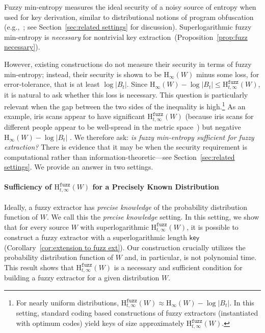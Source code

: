 \documentclass[11pt]{article}
\newcommand{\secref}[1]{\mbox{Section~\ref{#1}}}
\newcommand{\corref}[1]{\mbox{Corollary~\ref{#1}}}
\newcommand{\propref}[1]{\mbox{Proposition~\ref{#1}}}
\newcommand{\class}[1]{{\ensuremath{\mathsf{#1}}}}
\newcommand{\key}{\ensuremath{\class{key}}\xspace}
\newcommand{\Hoo}{\mathrm{H}_\infty}
\newcommand{\Hfuzz}{\mathrm{H}^{\mathtt{fuzz}}_{t,\infty}}
\begin{document}
Fuzzy min-entropy measures the ideal security of a noisy source of
entropy when used for key derivation, similar to distributional
notions of program obfuscation
(e.g.,~\cite{barak2001possibility,DBLP:conf/stoc/DodisS05,DBLP:conf/tcc/DodisS05};
see \secref{sec:related settings} for discussion).  Superlogarithmic fuzzy min-entropy is \emph{necessary} for nontrivial key extraction~(\propref{prop:fuzz necessary}).  

However, existing constructions do not measure their security in terms
of fuzzy min-entropy; instead, their security is shown to be
$\Hoo(W)$ minus some loss, for error-tolerance, that is at least $\log |B_t|$. Since $\Hoo(W)-\log |B_t| \le \Hfuzz(W)$, it is natural to ask whether this loss is necessary. This question is particularly relevant when the gap between the two sides of the inequality is high.\footnote{For nearly uniform distributions, $\Hfuzz(W) \approx \Hoo(W)- \log |B_t|$.  In this setting, standard coding based constructions of fuzzy extractors (instantiated with optimum codes) yield keys of size approximately $\Hfuzz(W)$.}  As an example, iris scans appear to have significant $\Hfuzz(W)$ (because iris scans for different people appear to be well-spread in the metric space~\cite{daugman2006probing}) but negative $\Hoo(W) -\log |B_t|$ \cite[Section 5]{blanton2009biometric}. We therefore ask: \emph{is fuzzy min-entropy sufficient for fuzzy extraction?} There is evidence that it may be when the security requirement is computational rather than information-theoretic---see \secref{sec:related settings}. We provide an answer in two settings.

\paragraph{Sufficiency of $\Hfuzz(W)$ for a Precisely Known Distribution}
Ideally, a fuzzy extractor has \emph{precise knowledge} of the
probability distribution function of $W$.  We call this  the
\emph{precise knowledge} setting.  In this setting, we show that for
every source $W$ with superlogarithmic $\Hfuzz(W)$, it is possible to
construct a fuzzy extractor with a superlogarithmic length $\key$
(\corref{cor:extension to fuzz ext}). Our construction crucially
utilizes the probability distribution function of $W$ and, in
particular, is not polynomial time.  This result shows that
$\Hfuzz(W)$ is a necessary and sufficient condition for building a
fuzzy extractor for a given distribution $W$.  
\end{document}
